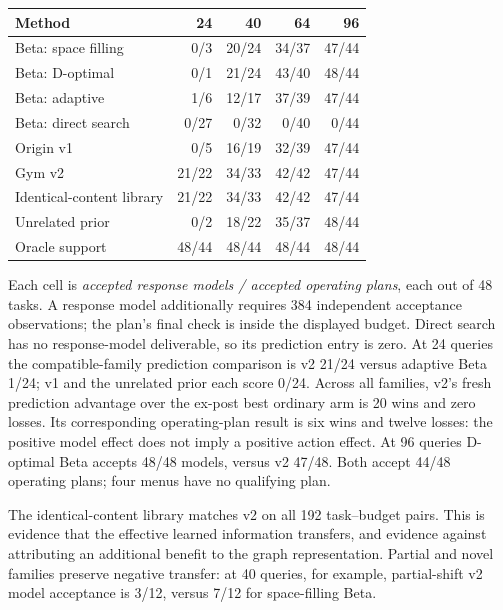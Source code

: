 \begin{center}\small\begin{tabular}{lrrrr}
\toprule
Method & 24 & 40 & 64 & 96 \\ \midrule
Beta: space filling & 0/3 & 20/24 & 34/37 & 47/44 \\
Beta: D-optimal & 0/1 & 21/24 & 43/40 & 48/44 \\
Beta: adaptive & 1/6 & 12/17 & 37/39 & 47/44 \\
Beta: direct search & 0/27 & 0/32 & 0/40 & 0/44 \\
Origin v1 & 0/5 & 16/19 & 32/39 & 47/44 \\
Gym v2 & 21/22 & 34/33 & 42/42 & 47/44 \\
Identical-content library & 21/22 & 34/33 & 42/42 & 47/44 \\
Unrelated prior & 0/2 & 18/22 & 35/37 & 48/44 \\
Oracle support & 48/44 & 48/44 & 48/44 & 48/44 \\
\bottomrule
\end{tabular}\end{center}
Each cell is \emph{accepted response models / accepted operating plans}, each out of 48 tasks. A response model additionally requires 384 independent acceptance observations; the plan's final check is inside the displayed budget. Direct search has no response-model deliverable, so its prediction entry is zero. At 24 queries the compatible-family prediction comparison is v2 21/24 versus adaptive Beta 1/24; v1 and the unrelated prior each score 0/24. Across all families, v2's fresh prediction advantage over the ex-post best ordinary arm is 20 wins and zero losses. Its corresponding operating-plan result is six wins and twelve losses: the positive model effect does not imply a positive action effect. At 96 queries D-optimal Beta accepts 48/48 models, versus v2 47/48. Both accept 44/48 operating plans; four menus have no qualifying plan.\par The identical-content library matches v2 on all 192 task--budget pairs. This is evidence that the effective learned information transfers, and evidence against attributing an additional benefit to the graph representation. Partial and novel families preserve negative transfer: at 40 queries, for example, partial-shift v2 model acceptance is 3/12, versus 7/12 for space-filling Beta.
